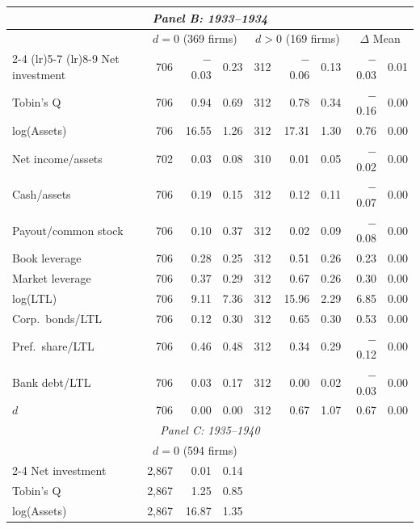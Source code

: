 \begin{table}[p]
\begin{threeparttable}
\begin{tabular}{l rrr rrr rr}
            \multicolumn{9}{c}{\textit{Panel B: 1933--1934}} \\
            \midrule
             & \multicolumn{3}{c}{$d = 0$ (369 firms)} & \multicolumn{3}{c}{$d > 0$ (169 firms)} & \multicolumn{2}{c}{$\Delta$ Mean} \\
            \cmidrule(lr){2-4} \cmidrule(lr){5-7} \cmidrule(lr){8-9}
            Net investment & 706 & $-$0.03 & 0.23 & 312 & $-$0.06 & 0.13 & $-$0.03 & 0.01 \\
            Tobin's Q & 706 & 0.94 & 0.69 & 312 & 0.78 & 0.34 & $-$0.16 & 0.00 \\
            log(Assets) & 706 & 16.55 & 1.26 & 312 & 17.31 & 1.30 & 0.76 & 0.00 \\
            Net income/assets & 702 & 0.03 & 0.08 & 310 & 0.01 & 0.05 & $-$0.02 & 0.00 \\
            Cash/assets & 706 & 0.19 & 0.15 & 312 & 0.12 & 0.11 & $-$0.07 & 0.00 \\
            Payout/common stock & 706 & 0.10 & 0.37 & 312 & 0.02 & 0.09 & $-$0.08 & 0.00 \\
            Book leverage & 706 & 0.28 & 0.25 & 312 & 0.51 & 0.26 & 0.23 & 0.00 \\
            Market leverage & 706 & 0.37 & 0.29 & 312 & 0.67 & 0.26 & 0.30 & 0.00 \\
            log(LTL) & 706 & 9.11 & 7.36 & 312 & 15.96 & 2.29 & 6.85 & 0.00 \\
            Corp.\ bonds/LTL & 706 & 0.12 & 0.30 & 312 & 0.65 & 0.30 & 0.53 & 0.00 \\
            Pref.\ share/LTL & 706 & 0.46 & 0.48 & 312 & 0.34 & 0.29 & $-$0.12 & 0.00 \\
            Bank debt/LTL & 706 & 0.03 & 0.17 & 312 & 0.00 & 0.02 & $-$0.03 & 0.00 \\
            \ensuremath{d} & 706 & 0.00 & 0.00 & 312 & 0.67 & 1.07 & 0.67 & 0.00 \\
            \midrule
            \multicolumn{9}{c}{\textit{Panel C: 1935--1940}} \\
            \midrule
             & \multicolumn{3}{c}{$d = 0$ (594 firms)} & \multicolumn{3}{c}{} & \multicolumn{2}{c}{} \\
            \cmidrule(lr){2-4}
            Net investment & 2,867 & 0.01 & 0.14 & & & & & \\
            Tobin's Q & 2,867 & 1.25 & 0.85 & & & & & \\
            log(Assets) & 2,867 & 16.87 & 1.35 & & & & & \\

\end{tabular}
\end{threeparttable}
\end{table}

